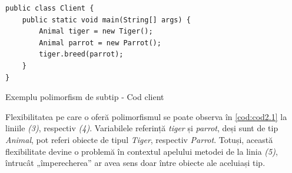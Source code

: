 \begin{listing}[H]
	\begin{verbatim}
public class Client {
    public static void main(String[] args) {
        Animal tiger = new Tiger();
        Animal parrot = new Parrot();
        tiger.breed(parrot);
    }
}
	\end{verbatim}
	\caption{Exemplu polimorfism de subtip - Cod client \label{cod:cod2.1}}
\end{listing}

Flexibilitatea pe care o oferă polimorfismul se poate observa în \cref{cod:cod2.1} la liniile \textit{(3)}, respectiv \textit{(4)}. Variabilele referință \textit{tiger} și \textit{parrot}, deși sunt de tip \textit{Animal}, pot referi obiecte de tipul \textit{Tiger}, respectiv \textit{Parrot}. Totuși, această flexibilitate devine o problemă în contextul apelului metodei de la linia \textit{(5)}, întrucât „împerecherea” ar avea sens doar între obiecte ale aceluiași tip.
